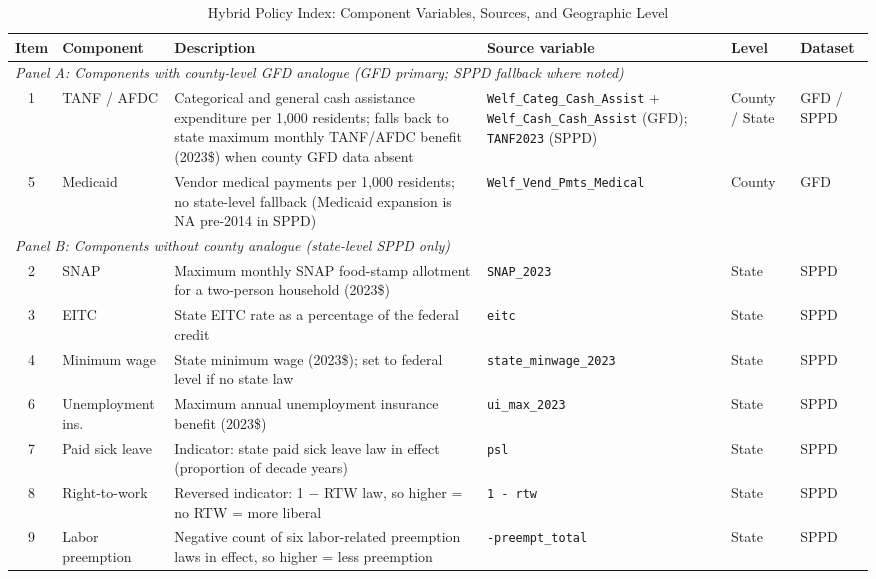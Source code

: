 \begin{table}[ht]
\centering
\caption{Hybrid Policy Index: Component Variables, Sources, and Geographic Level}
\label{tab:policy_sources}
\small
\begin{threeparttable}
\begin{tabular}{clp{4.6cm}p{2.6cm}lp{1.6cm}}
\toprule
\textbf{Item} & \textbf{Component} & \textbf{Description} & \textbf{Source variable} & \textbf{Level} & \textbf{Dataset} \\
\midrule
\multicolumn{6}{l}{\textit{Panel A: Components with county-level GFD analogue (GFD primary; SPPD fallback where noted)}} \\[4pt]
1 & TANF / AFDC  & Categorical and general cash assistance expenditure per 1,000 residents; falls back to state maximum monthly TANF/AFDC benefit (2023\$) when county GFD data absent & \texttt{Welf\_Categ\_Cash\_Assist} + \texttt{Welf\_Cash\_Cash\_Assist} (GFD); \texttt{TANF2023} (SPPD) & County / State & GFD / SPPD \\[6pt]
5 & Medicaid     & Vendor medical payments per 1,000 residents; no state-level fallback (Medicaid expansion is NA pre-2014 in SPPD) & \texttt{Welf\_Vend\_Pmts\_Medical} & County & GFD \\[10pt]
\multicolumn{6}{l}{\textit{Panel B: Components without county analogue (state-level SPPD only)}} \\[4pt]
2  & SNAP                  & Maximum monthly SNAP food-stamp allotment for a two-person household (2023\$) & \texttt{SNAP\_2023}           & State & SPPD \\[4pt]
3  & EITC                  & State EITC rate as a percentage of the federal credit & \texttt{eitc}                 & State & SPPD \\[4pt]
4  & Minimum wage          & State minimum wage (2023\$); set to federal level if no state law & \texttt{state\_minwage\_2023} & State & SPPD \\[4pt]
6  & Unemployment ins.     & Maximum annual unemployment insurance benefit (2023\$) & \texttt{ui\_max\_2023}        & State & SPPD \\[4pt]
7  & Paid sick leave       & Indicator: state paid sick leave law in effect (proportion of decade years) & \texttt{psl}                  & State & SPPD \\[4pt]
8  & Right-to-work         & Reversed indicator: 1 $-$ RTW law, so higher = no RTW = more liberal & \texttt{1 - rtw}              & State & SPPD \\[4pt]
9  & Labor preemption      & Negative count of six labor-related preemption laws in effect, so higher = less preemption & \texttt{-preempt\_total}      & State & SPPD \\[4pt]

\end{tabular}
\end{threeparttable}
\end{table}
